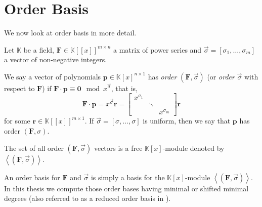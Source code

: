 \section{Order Basis}

We now look at order basis in more detail.

Let $\mathbb{K}$ be a field, $\mathbf{F}\in\mathbb{K}\left[\left[x\right]\right]^{m\times n}$
a matrix of power series and $\vec{\sigma}=\left[\sigma_{1},\dots,\sigma_{m}\right]$
a vector of non-negative integers. 
\begin{defn}
We say a vector of polynomials $\mathbf{p}\in\mathbb{K}\left[x\right]^{n\times1}$
has \emph{order} $\left(\mathbf{F},\vec{\sigma}\right)$ (or \emph{order}
$\vec{\sigma}$ with respect to $\mathbf{F}$) if $\mathbf{F}\cdot\mathbf{p}\equiv\mathbf{0}\mod x^{\vec{\sigma}}$,
that is, 
\[
\mathbf{F}\cdot\mathbf{p}=x^{\vec{\sigma}}\mathbf{r}=\begin{bmatrix}x^{\sigma_{1}}\\
 & \ddots\\
 &  & x^{\sigma_{m}}
\end{bmatrix}\mathbf{r}
\]
 for some $\mathbf{r}\in\mathbb{K}\left[\left[x\right]\right]^{m\times1}$.
If $\vec{\sigma}=\left[\sigma,\dots,\sigma\right]$ is uniform, then
we say that $\mathbf{p}$ has order $\left(\mathbf{F},\sigma\right).$
\begin{comment}
The vector of power series $\mathbf{r}$ is called the order $\left(\mathbf{F},\sigma\right)$-residual
of \textbf{$\mathbf{p}$}. 
\end{comment}
{} The set of all order $\left(\mathbf{F},\vec{\sigma}\right)$ vectors
is a free $\mathbb{K}\left[x\right]$-module denoted by $\left\langle \left(\mathbf{F},\vec{\sigma}\right)\right\rangle $. 
\end{defn}
An order basis for $\mathbf{F}$ and $\vec{\sigma}$ is simply a basis
for the $\mathbb{K}\left[x\right]$-module $\left\langle \left(\mathbf{F},\vec{\sigma}\right)\right\rangle $.
In this thesis we compute those order bases having minimal or shifted
minimal degrees (also referred to as a reduced order basis in \citep{BL1997}).



